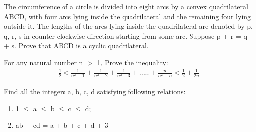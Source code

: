 \item The circumference of a circle is divided into eight arcs by a convex quadrilateral ABCD, with
four arcs lying inside the quadrilateral and the remaining four lying outside it. The lengths of
the arcs lying inside the quadrilateral are denoted by p, q, r, s in counter-clockwise direction
starting from some arc. Suppose p + r = q + s. Prove that ABCD is a cyclic quadrilateral.

\item For any natural number n $>$ 1, Prove the inequality:
\begin{align*}
\frac{1}{2} < \frac{1}{n^2+1} + \frac{1}{n^2+2} + \frac{1}{n^2+3}+.....+\frac{n}{n^2+n} < \frac{1}{2} + \frac{1}{2n}
\end{align*}

\item Find all the integers a, b, c, d satisfying following relations:
\begin{enumerate}
\item 1 $\leq$ a $\leq$ b $\leq$ c $\leq$ d;
\item ab + cd = a + b + c + d + 3
\end{enumerate}